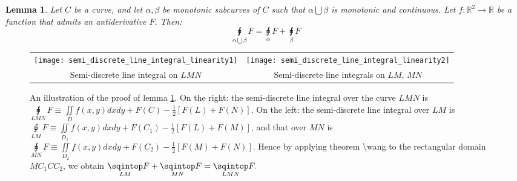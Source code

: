 \documentclass[11pt]{book}
\newtheorem{lem}[thm]{Lemma}
\begin{document}
\begin{lem}\label{semi_discrete_line_integral_additivity}Let $C$ be a curve, and let $\alpha,\beta$ be monotonic subcurves of $C$ such that $\alpha\bigcup\beta$ is monotonic and continuous. Let $f:\mathbb{R}^2\rightarrow\mathbb{R}$ be a function that admits an antiderivative $F$. Then:
$$\underset{\alpha\bigcup\beta}{\sqint}F=\underset{\alpha}{\sqint}F+\underset{\beta}{\sqint}F$$
\end{lem}

\begin{figure}
\begin{tabular}{cc}
  \texttt{[image: semi\_discrete\_line\_integral\_linearity1]} &   \texttt{[image: semi\_discrete\_line\_integral\_linearity2]}  \\
Semi-discrete line integral on $LMN$ & Semi-discrete line integrals on $LM$, $MN$ \\
\end{tabular}
\caption{An illustration of the proof of lemma \ref{semi_discrete_line_integral_additivity}. On the right: the semi-discrete
line integral over the curve $LMN$ is $\underset{LMN}{\sqint}F\equiv\underset{D}{\iint}f\left(x,y\right)dxdy+F\left(C\right)-\frac{1}{2}\left[F\left(L\right)+F\left(N\right)\right].$
On the left: the semi-discrete line integral over $LM$ is $\underset{LM}{\sqint}F\equiv\underset{D_{1}}{\iint}f\left(x,y\right)dxdy+F\left(C_{1}\right)-\frac{1}{2}\left[F\left(L\right)+F\left(M\right)\right]$,
and that over $MN$ is $\underset{MN}{\sqint}F\equiv\underset{D_{2}}{\iint}f\left(x,y\right)dxdy+F\left(C_{2}\right)-\frac{1}{2}\left[F\left(M\right)+F\left(N\right)\right]$.
Hence by applying theorem \textbackslash wang to the rectangular
domain $MC_{1}CC_{2}$, we obtain $\underset{LM}{\sqintop}F+\underset{MN}{\sqintop}F=\underset{LMN}{\sqintop}F.$}
\label{positive_domain}
\end{figure}
\end{document}
